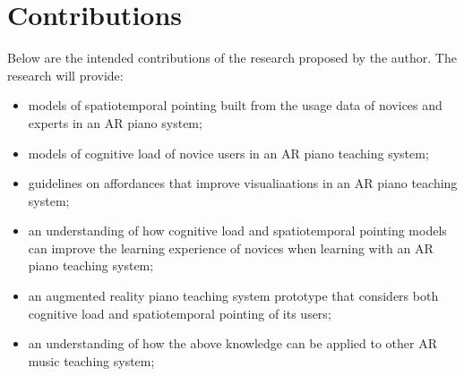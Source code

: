 \documentclass[manuscript,screen]{acmart}
\begin{document}
\section{Contributions}
Below are the intended contributions of the research proposed by the author. The research will provide: 
\begin{itemize}
    \item models of spatiotemporal pointing built from the usage data of novices and experts in an AR piano system;
    \item models of cognitive load of novice users in an AR piano teaching system;
    \item guidelines on affordances that improve visualiaations in an AR piano teaching system;
    \item an understanding of how cognitive load and spatiotemporal pointing models can improve the learning experience of novices when learning with an AR piano teaching system;
    \item an augmented reality piano teaching system prototype that considers both cognitive load and spatiotemporal pointing of its users;
    \item an understanding of how the above knowledge can be applied to other AR music teaching system;   
\end{itemize}
\end{document}
